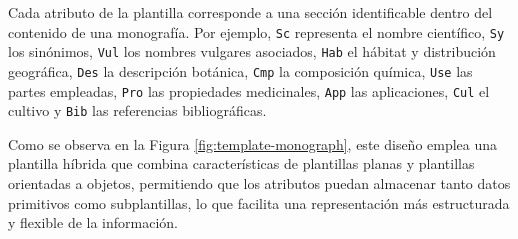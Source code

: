 Cada atributo de la plantilla corresponde a una sección identificable dentro del contenido 
de una monografía. Por ejemplo, 
\texttt{Sc} representa el nombre científico, 
\texttt{Sy} los sinónimos,
\texttt{Vul} los nombres vulgares asociados, 
\texttt{Hab} el hábitat y distribución geográfica, 
\texttt{Des} la descripción botánica, 
\texttt{Cmp} la composición química, 
\texttt{Use} las partes empleadas, 
\texttt{Pro} las propiedades medicinales, 
\texttt{App} las aplicaciones, 
\texttt{Cul} el cultivo y 
\texttt{Bib} las referencias bibliográficas.

Como se observa en la Figura \ref{fig:template-monograph}, este diseño emplea una plantilla híbrida 
que combina características de plantillas planas y plantillas orientadas a objetos, 
permitiendo que los atributos puedan almacenar tanto datos primitivos como subplantillas, 
lo que facilita una representación más estructurada y flexible de la información.

